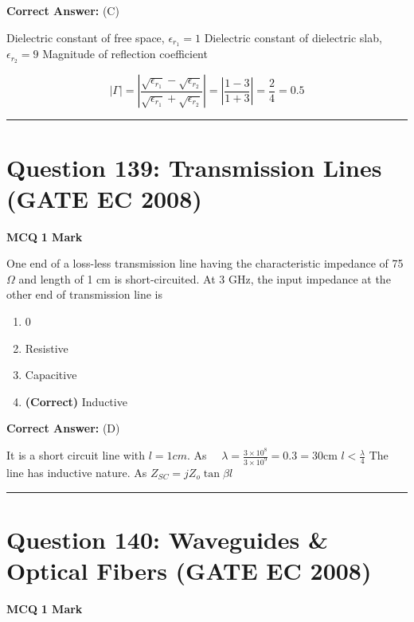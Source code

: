 \documentclass[11pt,a4paper]{article}
\begin{document}
\noindent \textbf{Correct Answer:} (C)

\begin{tcolorbox}[solbox, title=Detailed Solution -- Question 138]
Dielectric constant of free space, $\epsilon_{r_{1}}=1$
 Dielectric constant of dielectric slab, $\epsilon_{r_{2}}=9$
 Magnitude of reflection coefficient 

\[
|\Gamma|=\left|\frac{\sqrt{\epsilon_{r_{1}}}-\sqrt{\epsilon_{r_{2}}}}{\sqrt{\epsilon_{r_{1}}}+\sqrt{\epsilon_{r_{2}}}}\right|=\left|\frac{1-3}{1+3}\right|=\frac{2}{4}=0.5
\]
\end{tcolorbox}

\vspace{1.5em}
\hrule
\vspace{1.5em}

\section*{Question 139: Transmission Lines (GATE EC 2008)}
\noindent \textbf{\color{primary}MCQ} \hfill \textbf{\color{secondary}1 Mark}


\noindent One end of a loss-less transmission line having the characteristic impedance of
75$\Omega$ and length of 1 cm is short-circuited. At 3 GHz, the input impedance at the other end of transmission line is


\begin{enumerate}[label=(\Alph*)]
    \item 0
    \item Resistive
    \item Capacitive
    \item \textbf{(Correct)} Inductive
\end{enumerate}

\noindent \textbf{Correct Answer:} (D)

\begin{tcolorbox}[solbox, title=Detailed Solution -- Question 139]
It is a short circuit line with $l =1 cm.$
 As $\quad \lambda=\frac{3 \times 10^{8}}{3 \times 10^{9}}=0.3=30 \mathrm{cm}$
$l < \frac{\lambda}{4}$
 The line has inductive nature.
 As $Z_{S C}=j Z_{o} \tan \beta l$
\end{tcolorbox}

\vspace{1.5em}
\hrule
\vspace{1.5em}

\section*{Question 140: Waveguides \& Optical Fibers (GATE EC 2008)}
\noindent \textbf{\color{primary}MCQ} \hfill \textbf{\color{secondary}1 Mark}
\end{document}
